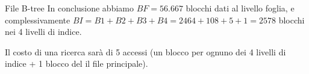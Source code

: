 \begin{Example}{File B-tree}{}
    In conclusione abbiamo $BF = 56.667$ blocchi dati al livello foglia, e complessivamente $BI = B1 + B2 + B3 + B4 = 2464 + 108 + 5 + 1 = 2578$ blocchi nei 4 livelli di indice.

    Il costo di una ricerca sarà di 5 accessi (un blocco per ognuno dei 4 livelli di indice + 1 blocco del il file principale).
\end{Example}